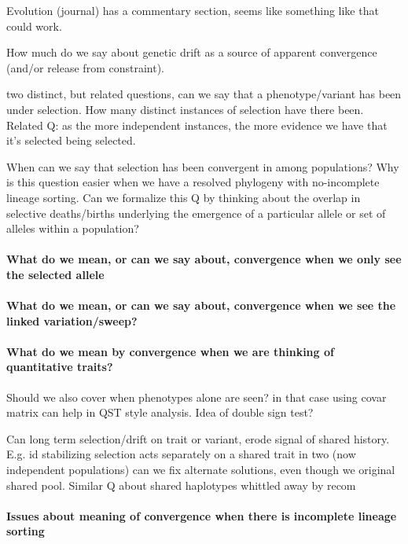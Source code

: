 
Evolution (journal) has a commentary section, seems like something like that could work.




How much do we say about genetic drift as a source of apparent convergence (and/or release from constraint).

two distinct, but related questions, can we say that a phenotype/variant has been under selection. How many distinct instances of selection have there been. 
Related Q: as the more independent instances, the more evidence we have that it's
selected being selected.  

When can we say that selection has been convergent in among populations?
Why is this question easier when we have a resolved phylogeny with
no-incomplete lineage sorting.
Can we formalize this Q by thinking about the overlap in selective deaths/births underlying the emergence of a particular allele or set of alleles within a population?


\paragraph{What do we mean, or can we say about, convergence when we only see the selected allele}

\paragraph{What do we mean, or can we say about, convergence when we see the linked variation/sweep?}

\paragraph{What do we mean by convergence when we are thinking of quantitative traits?}
Should we also cover when phenotypes alone are seen? in that case using covar matrix can help in QST style analysis.
Idea of double sign test?

Can long term selection/drift on trait or variant, erode signal of shared
history. E.g. id stabilizing selection acts separately on a shared
trait in two (now independent populations) can we fix alternate
solutions, even though we original shared pool. Similar Q about shared
haplotypes whittled away by recom

\paragraph{Issues about meaning of convergence when there is incomplete lineage sorting} 

